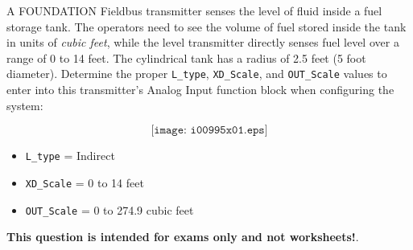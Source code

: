 

A FOUNDATION Fieldbus transmitter senses the level of fluid inside a fuel storage tank.  The operators need to see the volume of fuel stored inside the tank in units of {\it cubic feet}, while the level transmitter directly senses fuel level over a range of 0 to 14 feet.  The cylindrical tank has a radius of 2.5 feet (5 foot diameter).  Determine the proper {\tt L\_type}, {\tt XD\_Scale}, and {\tt OUT\_Scale} values to enter into this transmitter's Analog Input function block when configuring the system:

$$\texttt{[image: i00995x01.eps]}$$







\begin{itemize}
\item{} {\tt L\_type} = Indirect
\item{} {\tt XD\_Scale} = 0 to 14 feet
\item{} {\tt OUT\_Scale} = 0 to 274.9 cubic feet
\end{itemize}







{\bf This question is intended for exams only and not worksheets!}.




